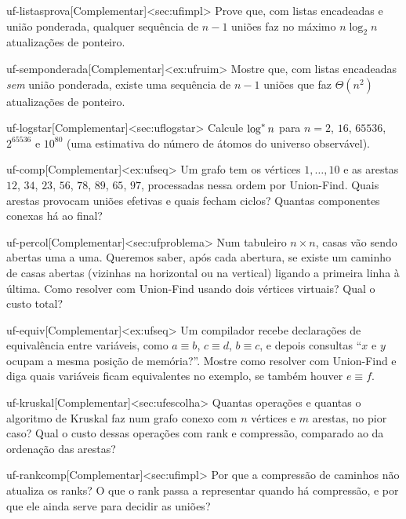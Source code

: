 \begin{exercicio}{uf-listasprova}[Complementar]<sec:ufimpl>
Prove que, com listas encadeadas e união ponderada, qualquer sequência de $n-1$ uniões faz no máximo $n\log_2n$ atualizações de ponteiro.
\end{exercicio}
\begin{exercicio}{uf-semponderada}[Complementar]<ex:ufruim>
Mostre que, com listas encadeadas \emph{sem} união ponderada, existe uma sequência de $n-1$ uniões que faz $\Theta(n^2)$ atualizações de ponteiro.
\end{exercicio}
\begin{exercicio}{uf-logstar}[Complementar]<sec:uflogstar>
Calcule $\log^{*} n$ para $n=2$, $16$, $65536$, $2^{65536}$ e $10^{80}$ (uma estimativa do número de átomos do universo observável).
\end{exercicio}
\begin{exercicio}{uf-comp}[Complementar]<ex:ufseq>
Um grafo tem os vértices $1,\dots,10$ e as arestas $12$, $34$, $23$, $56$, $78$, $89$, $65$, $97$, processadas nessa ordem por Union-Find. Quais arestas provocam uniões efetivas e quais fecham ciclos? Quantas componentes conexas há ao final?
\end{exercicio}
\begin{exercicio}{uf-percol}[Complementar]<sec:ufproblema>
Num tabuleiro $n\times n$, casas vão sendo abertas uma a uma. Queremos saber, após cada abertura, se existe um caminho de casas abertas (vizinhas na horizontal ou na vertical) ligando a primeira linha à última. Como resolver com Union-Find usando dois vértices virtuais? Qual o custo total?
\end{exercicio}
\begin{exercicio}{uf-equiv}[Complementar]<ex:ufseq>
Um compilador recebe declarações de equivalência entre variáveis, como $a\equiv b$, $c\equiv d$, $b\equiv c$, e depois consultas ``$x$ e $y$ ocupam a mesma posição de memória?''. Mostre como resolver com Union-Find e diga quais variáveis ficam equivalentes no exemplo, se também houver $e\equiv f$.
\end{exercicio}
\begin{exercicio}{uf-kruskal}[Complementar]<sec:ufescolha>
Quantas operações \Find{} e quantas \Union{} o algoritmo de Kruskal faz num grafo conexo com $n$ vértices e $m$ arestas, no pior caso? Qual o custo dessas operações com rank e compressão, comparado ao da ordenação das arestas?
\end{exercicio}
\begin{exercicio}{uf-rankcomp}[Complementar]<sec:ufimpl>
Por que a compressão de caminhos não atualiza os ranks? O que o rank passa a representar quando há compressão, e por que ele ainda serve para decidir as uniões?
\end{exercicio}
